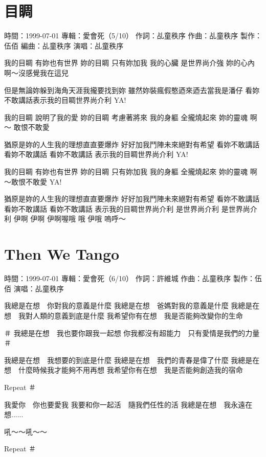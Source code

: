 \documentclass[UTF8,a4paper,oneside,twocolumn,12pt]{ctexbook}
\newcommand{\infopair}[2]{\textbullet #1：#2}
\newcommand{\zc}[1][伍佰]{\infopair{作詞}{#1}}
\newcommand{\zq}[1][伍佰]{\infopair{作曲}{#1}}
\newcommand{\bq}[1][伍佰]{\infopair{編曲}{#1}}
\newcommand{\zj}[1]{\infopair{專輯}{#1}}
\newcommand{\zz}[1]{\infopair{製作}{#1}}
\newcommand{\sj}[1]{\infopair{時間}{#1}}
\newenvironment{info}{\begin{flushleft}\kaishu
	}
	{\end{flushleft}\normalsize\yahei\par}
\newenvironment{lyric}{
	}
{}
\begin{document}
\section{目睭}
\begin{info}
	\sj{1999-07-01}
	\zj{愛會死（5/10）}
	\zc[乩童秩序]
	\zq[乩童秩序]
	\zz{伍佰}
	\bq[乩童秩序]
	\infopair{演唱}{乩童秩序}
\end{info}
\begin{lyric}
	我的目睭 有妳也有世界 妳的目睭 只有妳加我
	我的心臟 是世界尚介強 妳的心內 啊～沒感覺我在這兒

	但是無論妳躲到海角天涯我攏要找到妳 雖然妳裝瘋假憨迺來迺去當我是潘仔
	看妳不敢講話表示我的目睭世界尚介利 YA!

	我的目睭 說明了我的愛 妳的目睭 考慮著將來
	我的身軀 全攏燒起來 妳的靈魂 啊～ 敢恨不敢愛

	猶原是妳的人生我的理想直直要爆炸 好好加我鬥陣未來絕對有希望
	看妳不敢講話 看妳不敢講話 看妳不敢講話 表示我的目睭世界尚介利 YA!

	我的目睭 有妳也有世界 妳的目睭 只有妳加我
	我的身軀 全攏燒起來 妳的靈魂 啊～敢恨不敢愛 YA!

	猶原是妳的人生我的理想直直要爆炸 好好加我鬥陣未來絕對有希望
	看妳不敢講話 看妳不敢講話 看妳不敢講話 表示我的目睭世界尚介利
	是世界尚介利 是世界尚介利 伊啊 伊啊 伊啊喔哦 哦 伊哦 嗚呼～
\end{lyric}

\section{Then We Tango}
\begin{info}
	\sj{1999-07-01}
	\zj{愛會死（6/10）}
	\zc[許維城]
	\zq[乩童秩序]
	\zz{伍佰}
	\infopair{演唱}{乩童秩序}
\end{info}
\begin{lyric}
	我總是在想　你對我的意義是什麼
	我總是在想　爸媽對我的意義是什麼
	我總是在想　我對人類的意義到底是什麼
	我希望你有在想　我是否能夠改變你的生命

	＃ 我總是在想　我也要你跟我一起想
	你我都沒有超能力　只有愛情是我們的力量＃

	我總是在想　我想要的到底是什麼
	我總是在想　我們的青春是偉了什麼
	我總是在想　什麼時候我才能夠不用再想
	我希望你有在想　我是否能夠創造我的宿命

	Repeat ＃

	我愛你　你也要愛我
	我要和你一起活　隨我們任性的活
	我總是在想　我永遠在想......

	吼～～吼～～

	Repeat ＃
\end{lyric}
\end{document}
